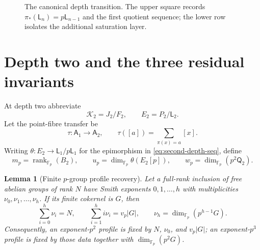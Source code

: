 \documentclass[12pt,a4paper]{article}
\newtheorem{lemma}[theorem]{Lemma}
\theoremstyle{definition}
\newcommand{\F}{\mathbb F}
\newcommand{\A}{\mathsf A}
\newcommand{\LL}{\mathsf L}
\newcommand{\QQ}{\mathsf Q}
\newcommand{\rank}{\operatorname{rank}}
\newcommand{\vp}{v_p}
\begin{document}
\begin{figure}[t]
\centering
{}
\caption{The canonical depth transition.  The upper square
records $\pi_*(\LL_n)=p\LL_{n-1}$ and the first quotient sequence; the lower
row isolates the additional saturation layer.}
\label{fig:depth-transition}
\end{figure}

\section{Depth two and the three residual invariants}\label{sec:S04}

At depth two abbreviate
\[
 \mathcal K_2=J_2/F_2,
 \qquad E_2=P_2/\LL_2.
\]
Let the point-fibre transfer be
\[
 \tau:\A_1\longrightarrow\A_2,\qquad
 \tau([a])=\sum_{\pi(x)=a}[x].
\]
Writing $\theta:E_2\to\LL_1/p\LL_1$ for the epimorphism in
\eqref{eq:second-depth-seq}, define
\begin{equation}\label{eq:mpupwp}
 m_p=\rank_{\F_p}(B_2),\qquad
 u_p=\dim_{\F_p}\theta(E_2[p]),\qquad
 w_p=\dim_{\F_p}(p^2\QQ_2).
\end{equation}

\begin{lemma}[Finite $p$-group profile recovery]
\label{lem:profile-recovery}
Let a full-rank inclusion of free abelian groups of rank $N$ have Smith
exponents $0,1,\ldots,h$ with multiplicities
$\nu_0,\nu_1,\ldots,\nu_h$.  If its finite cokernel is $G$, then
\begin{equation}\label{eq:profile-recovery}
 \sum_{i=0}^h\nu_i=N,\qquad
 \sum_{i=1}^h i\nu_i=\vp|G|,\qquad
 \nu_h=\dim_{\F_p}(p^{h-1}G).
\end{equation}
Consequently, an exponent-$p^2$ profile is fixed by $N$, $\nu_0$, and
$\vp|G|$; an exponent-$p^3$ profile is fixed by those data together with
$\dim_{\F_p}(p^2G)$.
\end{lemma}
\end{document}
